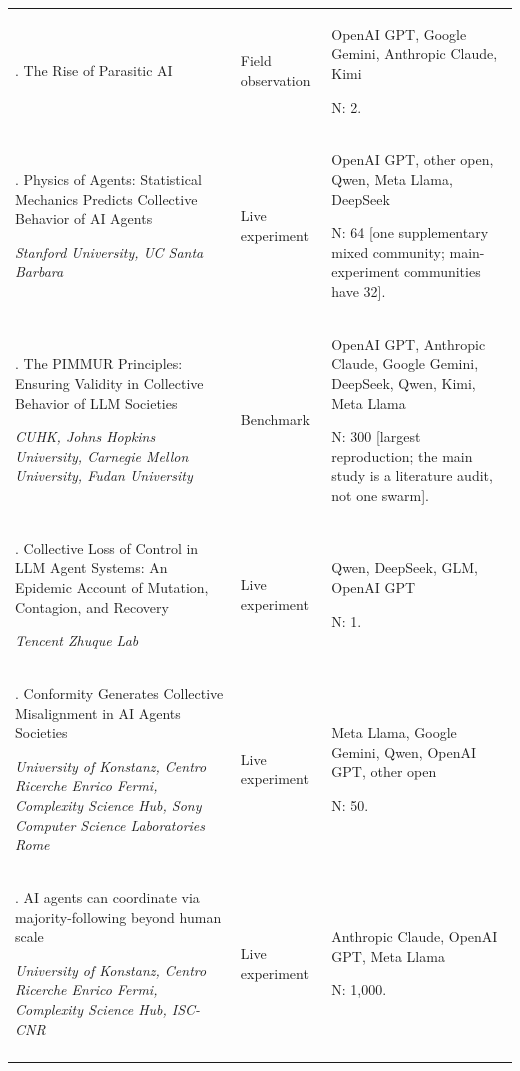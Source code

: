 \begin{longtable}{@{}>{\raggedright\arraybackslash}p{}>{\raggedright\arraybackslash}p{}>{\raggedright\arraybackslash}p{}@{}}
111. The Rise of Parasitic AI \citep{parasitic-ai} & Field observation & OpenAI GPT, Google Gemini, Anthropic Claude, Kimi\par N: 2. \\ \addlinespace[2pt]
112. Physics of Agents: Statistical Mechanics Predicts Collective Behavior of AI Agents \citep{physics-of-agents}\par\emph{Stanford University, UC Santa Barbara} & Live experiment & OpenAI GPT, other open, Qwen, Meta Llama, DeepSeek\par N: 64 [one supplementary mixed community; main-experiment communities have 32]. \\ \addlinespace[2pt]
113. The PIMMUR Principles: Ensuring Validity in Collective Behavior of LLM Societies \citep{pimmur-principles}\par\emph{CUHK, Johns Hopkins University, Carnegie Mellon University, Fudan University} & Benchmark & OpenAI GPT, Anthropic Claude, Google Gemini, DeepSeek, Qwen, Kimi, Meta Llama\par N: 300 [largest reproduction; the main study is a literature audit, not one swarm]. \\ \addlinespace[2pt]
114. Collective Loss of Control in LLM Agent Systems: An Epidemic Account of Mutation, Contagion, and Recovery \citep{prev-collective-loss-of-control}\par\emph{Tencent Zhuque Lab} & Live experiment & Qwen, DeepSeek, GLM, OpenAI GPT\par N: 1. \\ \addlinespace[2pt]
115. Conformity Generates Collective Misalignment in AI Agents Societies \citep{prev-conformity-misalignment}\par\emph{University of Konstanz, Centro Ricerche Enrico Fermi, Complexity Science Hub, Sony Computer Science Laboratories Rome} & Live experiment & Meta Llama, Google Gemini, Qwen, OpenAI GPT, other open\par N: 50. \\ \addlinespace[2pt]
116. AI agents can coordinate via majority-following beyond human scale \citep{prev-demarzo-majority}\par\emph{University of Konstanz, Centro Ricerche Enrico Fermi, Complexity Science Hub, ISC-CNR} & Live experiment & Anthropic Claude, OpenAI GPT, Meta Llama\par N: 1,000. \\ \addlinespace[2pt]

\end{longtable}
